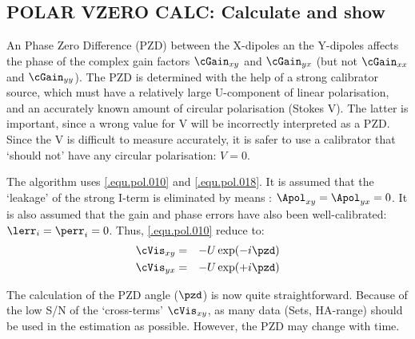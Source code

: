 \subsection{POLAR VZERO CALC: Calculate and show}
\label{.vzero.calc}

An Phase Zero Difference (PZD) between the X-dipoles an the Y-dipoles affects
the phase of the complex gain factors $\cGain_{xy}$ and $\cGain_{yx}$ (but not
$\cGain_{xx}$ and $\cGain_{yy}$). The PZD is determined with the help of a
strong calibrator source, which must have a relatively large U-component of
linear polarisation, and an accurately known amount of circular polarisation
(Stokes V). The latter is important, since a wrong value for V will be
incorrectly interpreted as a PZD. Since the V is difficult to measure
accurately, it is safer to use a calibrator that `should not' have any circular
polarisation: $V=0$.

The algorithm uses \eqref{.equ.pol.010} and \eqref{.equ.pol.018}. It is assumed
that the `leakage' of the strong I-term is eliminated by means
: $\Apol_{xy} = \Apol_{yx} = 0$.  It is also assumed
that the gain and phase errors have also been well-calibrated: $\lerr_i =
\perr_i = 0$. Thus, \eqref{.equ.pol.010} reduce to:
\begin{eqnarray}
  \cVis_{xy} & = & -U\exp (-i\pzd) \nonumber \\
  \cVis_{yx} & = & -U\exp (+i\pzd)
\end{eqnarray}

The calculation of the PZD angle ($\pzd$) is now quite straightforward. Because
of the low S/N of the `cross-terms' $\cVis_{xy}$, as many data (Sets, HA-range)
should be used in the estimation as possible. However, the PZD may change with
time.

